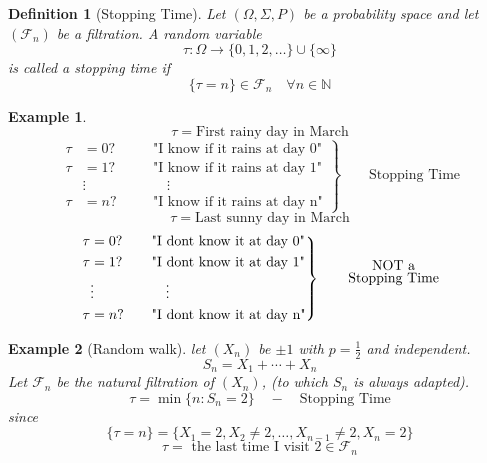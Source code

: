 \documentclass[12pt]{article}
\def\FF{\mathbb{F}}
\def\NN{\mathbb{N}}
\def\FF{\mathcal{F}}
\newtheorem{definition}{Definition}[section]
\newtheorem{example}{Example}[section]
\begin{document}
\begin{definition}[Stopping Time] Let $(\Omega, \Sigma, P)$ be a probability space and let $(\FF_n)$ be a filtration. A random variable \[\tau:\Omega \rightarrow \{0,1,2,\dots \} \cup \{\infty\}\]
is called a stopping time if 
\[ \{\tau=n\} \in \FF_n \quad \forall n \in \NN\]
\end{definition}

\begin{example}
\[\tau = \text{First rainy day in March}\]
\[ \left.\begin{aligned}
\tau&= 0? &\quad &\text{"I know if it rains at day 0"}\\
\tau&= 1? &\quad &\text{"I know if it rains at day 1"}\\
&\vdots & \quad & \quad \vdots \\
\tau&= n? &\quad &\text{"I know if it rains at day n"}
\end{aligned}
\right\}
\qquad \text{Stopping Time}\]
\[\tau = \text{Last sunny day in March}\]
\[ \left.\begin{aligned}
\tau&= 0? &\quad &\text{"I dont know it at day 0"}\\
\tau&= 1? &\quad &\text{"I dont know it at day 1"}\\
&\vdots & \quad & \quad \vdots \\
\tau&= n? &\quad &\text{"I dont know it at day n"}
\end{aligned}
\right\}
\qquad \overset{\text{\normalsize NOT a}}{\text{Stopping Time}}\]
\end{example}

\begin{example}[Random walk] let $(X_n)$ be $\pm 1$ with $p=\tfrac{1}{2}$ and independent. 
\[S_n = X_1 + \cdots +X_n \]
Let $\FF_n$ be the natural filtration of $(X_n)$, (to which $S_n$ is always adapted).
\[\tau= \min\{n : S_n = 2\} \quad - \quad \text{Stopping Time}\]
since 
\[\{\tau = n\} = \{X_1 = 2, X_2 \neq 2, \dots, X_{n-1} \neq 2, X_n = 2\}\]
\[\tau = \text{ the last time I visit }2 \in \FF_n\]
\end{example}


 
\end{document}
